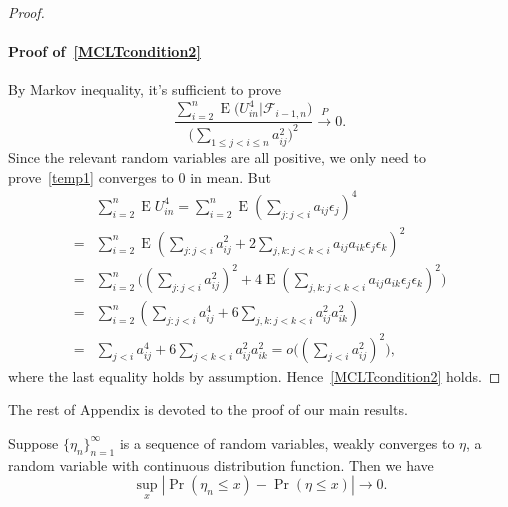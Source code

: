 \documentclass[smallcondensed,final,natbib]{svjour3}          %
\DeclareMathOperator{\myE}{E}
\begin{document}
\begin{proof}
     \paragraph{Proof of~\eqref{MCLTcondition2}}
     By Markov inequality, it's sufficient to prove
     \begin{equation}\label{temp1}
         \frac{\sum_{i=2}^n \myE\big(U_{in}^4\big|\mathcal{F}_{i-1,n}\big)}{{\big(\sum_{1\leq j<i\leq n} a_{ij}^2\big)}^2}\xrightarrow{P} 0.
     \end{equation}
     Since the relevant random variables are all positive, we only need to prove~\eqref{temp1} converges to $0$ in mean. But
     \begin{equation*}
         \begin{aligned}
             &\sum_{i=2}^n \myE U_{in}^4
             =
             \sum_{i=2}^n \myE {(\sum_{j:j<i}a_{ij}\epsilon_j)}^4\\
             =&
             \sum_{i=2}^n \myE {(\sum_{j:j<i}a_{ij}^2+2\sum_{j,k:j<k<i}a_{ij}a_{ik}\epsilon_j \epsilon_k)}^2\\
             =&
             \sum_{i=2}^n  \big({(\sum_{j:j<i}a_{ij}^2)}^2+4\myE{(\sum_{j,k:j<k<i}a_{ij}a_{ik}\epsilon_j \epsilon_k)}^2 \big)\\
             =&
             \sum_{i=2}^n  (\sum_{j:j<i}a_{ij}^4+6\sum_{j,k:j<k<i}a_{ij}^2 a_{ik}^2)\\
             =&
             \sum_{j<i}a_{ij}^4+6\sum_{j<k<i}a_{ij}^2 a_{ik}^2
             =
             o\big({(\sum_{j<i} a_{ij}^2)}^2\big),
         \end{aligned}
     \end{equation*}
     where the last equality holds by assumption. Hence~\eqref{MCLTcondition2} holds.
 \end{proof}

The rest of Appendix is devoted to the proof of our main results.
\begin{lemma}\label{lemmaUniformSimple}
    Suppose $\{\eta_n\}_{n=1}^{\infty}$ is a sequence of random variables, weakly converges to $\eta$, a random variable with continuous distribution function.
    Then we have
    \begin{equation*}
    \sup_{x}|\Pr(\eta_n\leq x)-\Pr(\eta\leq x)|\to 0.
    \end{equation*}
\end{lemma}
\end{document}
